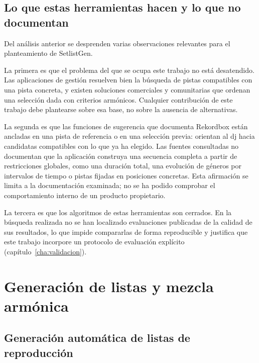 \subsection{Lo que estas herramientas hacen y lo que no documentan}

Del análisis anterior se desprenden varias observaciones relevantes para el planteamiento de SetlistGen.

La primera es que el problema del que se ocupa este trabajo no está desatendido. Las aplicaciones de gestión resuelven bien la búsqueda de pistas compatibles con una pista concreta, y existen soluciones comerciales y comunitarias que ordenan una selección dada con criterios armónicos. Cualquier contribución de este trabajo debe plantearse sobre esa base, no sobre la ausencia de alternativas.

La segunda es que las funciones de sugerencia que documenta Rekordbox están ancladas en una pista de referencia o en una selección previa: orientan al \acs{dj} hacia candidatas compatibles con lo que ya ha elegido. Las fuentes consultadas no documentan que la aplicación construya una secuencia completa a partir de restricciones globales, como una duración total, una evolución de géneros por intervalos de tiempo o pistas fijadas en posiciones concretas. Esta afirmación se limita a la documentación examinada; no se ha podido comprobar el comportamiento interno de un producto propietario.

La tercera es que los algoritmos de estas herramientas son cerrados. En la búsqueda realizada no se han localizado evaluaciones publicadas de la calidad de sus resultados, lo que impide compararlas de forma reproducible y justifica que este trabajo incorpore un protocolo de evaluación explícito (capítulo~\ref{cha:validacion}).

\section{Generación de listas y mezcla armónica}
\label{sec:eda-generacion}

\subsection{Generación automática de listas de reproducción}

